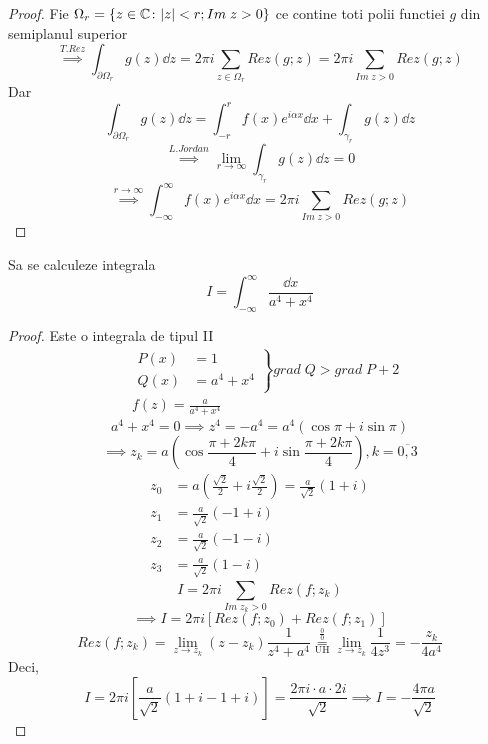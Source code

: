 \begin{tip}
\begin{proof}
        Fie $\Omega_r = \{z \in \mathbb{C} \colon |z|<r ; Im\; z>0\}$ ce contine toti polii functiei
        $g$ din semiplanul superior
        \[
            \overset{T.Rez}{\implies} \int_{\partial \Omega_r} g(z) \dd z
                = 2 \pi i \sum_{z \in \Omega_r} Rez(g;z)
                = 2 \pi i \sum_{Im\; z > 0} Rez(g;z)
        \]
        Dar
        \[
            \int_{\partial \Omega_r} g(z) \dd z
                = \int_{-r}^{r} f(x)e^{i \alpha x} \dd x
                + \int_{\gamma_r} g(z) \dd z
        \]
        \[
            \overset{L.Jordan}{\implies} \lim_{r \to \infty} \int_{\gamma_r} g(z) \dd z = 0
        \]
        \[
            \overset{r\to\infty}{\implies} \int_{-\infty}^{\infty} f(x)e^{i \alpha x} \dd x
                = 2 \pi i \sum_{Im\; z > 0} Rez(g;z)
        \]
    \end{proof}

\end{tip}

\begin{aplicatie}[1]
    Sa se calculeze integrala
    \[
    I = \int_{-\infty}^{\infty} \frac{\dd x}{a^4+x^4}
    \]
    \begin{proof}

    Este o integrala de tipul II
    \begin{align*}
        &\left .
            \begin{aligned}
                P(x) &= 1 \\
                Q(x) &= a^4 +x^4
            \end{aligned}
        \right \}
        grad\; Q > grad\; P+2 \\
        & f(z) = \frac{a}{a^4 +x^4}
    \end{align*}
    \[
        a^4 +x^4 = 0 \implies z^4 = -a^4 = a^4 (\cos \pi + i\sin \pi)
    \]
    \[
        \implies z_k = a \left( \cos \frac{\pi+2k\pi}{4} + i \sin \frac{\pi+2k\pi}{4} \right)
            , k=\overline{0,3}
    \]
    \begin{align*}
        z_0 &= a \left(\frac{\sqrt 2}{2} + i\frac{\sqrt 2}{2} \right)
            = \frac{a}{\sqrt 2} (1+i) \\
        z_1 &= \frac{a}{\sqrt 2} (-1+i) \\
        z_2 &= \frac{a}{\sqrt 2} (-1-i) \\
        z_3 &= \frac{a}{\sqrt 2} (1-i)
    \end{align*}
    \[
        I = 2 \pi i \sum_{Im \; z_k >0} Rez(f;z_k)
    \]
    \[
        \implies I = 2 \pi i [Rez(f;z_0) + Rez(f;z_1)]
    \]
    \[
        Rez(f;z_k) = \lim_{z \to z_k} (z-z_k) \frac{1}{z^4+a^4}
            \overset{\frac{0}{0}}{\underset{\mathrm{U H}}{=}}
            \lim_{z \to z_k} \frac{1}{4z^3}
            = - \frac{z_k}{4a^4}
    \]
    Deci,
    \[
        I = 2 \pi i \left[ \frac{a}{\sqrt 2} (1+i -1 +i) \right]
            = \frac{2 \pi i \cdot a \cdot 2i}{\sqrt 2}
            \implies I = - \frac{4 \pi a}{\sqrt 2}
    \]
    \end{proof}
\end{aplicatie}

